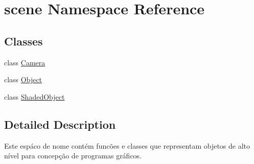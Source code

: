 \hypertarget{namespacescene}{}\section{scene Namespace Reference}
\label{namespacescene}
\subsection*{Classes}
\begin{DoxyCompactItemize}
\item 
class \mbox{\hyperlink{classscene_1_1_camera}{Camera}}
\item 
class \mbox{\hyperlink{classscene_1_1_object}{Object}}
\item 
class \mbox{\hyperlink{classscene_1_1_shaded_object}{Shaded\+Object}}
\end{DoxyCompactItemize}


\subsection{Detailed Description}
Este espáco de nome contém funcões e classes que representam objetos de alto nível para concepção de programas gráficos. 